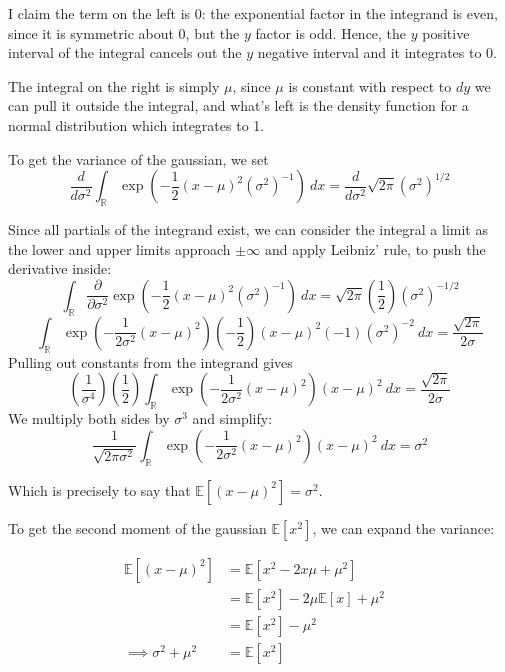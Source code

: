 \documentclass[../main.tex]{subfiles}
\begin{document}
\begin{enumerate}
I claim the term on the left is 0: the exponential factor in the integrand is even, since it is symmetric about 0, but the $y$ factor is odd. Hence, the $y$ positive interval of the integral cancels out the $y$ negative interval and it integrates to 0.

The integral on the right is simply $\mu$, since $\mu$ is constant with respect to $dy$ we can pull it outside the integral, and what's left is the density function for a normal distribution which integrates to 1.

To get the variance of the gaussian, we set
$$\frac{d}{d\sigma^2}\int_\mathbb{R} \exp(-\frac{1}{2}(x-\mu)^2(\sigma^2)^{-1}) \ dx = \frac{d}{d\sigma^2}\sqrt{2\pi}(\sigma^2)^{1/2}$$

Since all partials of the integrand exist, we can consider the integral a limit as the lower and upper limits approach $\pm \infty$ and apply Leibniz' rule, to push the derivative inside:
$$\int_\mathbb{R} \frac{\partial}{\partial \sigma^2}
\exp(-\frac{1}{2}(x-\mu)^2(\sigma^2)^{-1}) \ dx = \sqrt{2\pi}\left(\frac{1}{2}\right)(\sigma^2)^{-1/2}$$
$$\int_\mathbb{R} \exp\left(-\frac{1}{2\sigma^2}(x - \mu)^2\right)\left(-\frac{1}{2}\right)(x-\mu)^2(-1)(\sigma^2)^{-2} \ dx = \frac{\sqrt{2\pi}}{2\sigma}$$
Pulling out constants from the integrand gives
$$\left(\frac{1}{\sigma^4}\right)\left(\frac{1}{2}\right)\int_\mathbb{R} \exp\left(-\frac{1}{2\sigma^2}(x-\mu)^2\right)(x-\mu)^2 \ dx = \frac{\sqrt{2\pi}}{2\sigma}$$
We multiply both sides by $\sigma^3$ and simplify:
$$\frac{1}{\sqrt{2\pi\sigma^2}}\int_\mathbb{R} \exp\left(-\frac{1}{2\sigma^2}(x-\mu)^2\right)(x-\mu)^2 \ dx = \sigma^2$$

Which is precisely to say that $\mathbb{E}[(x-\mu)^2] = \sigma^2$.

To get the second moment of the gaussian $\mathbb{E}[x^2]$, we can expand the variance:

\begin{align*}
	\mathbb{E}[(x-\mu)^2] &= \mathbb{E}[x^2 -2x\mu + \mu^2] &\\
	&=\mathbb{E}[x^2] - 2\mu\mathbb{E}[x] + \mu^2 &\\
	&= \mathbb{E}[x^2] - \mu^2 &\\
\implies \sigma^2 + \mu^2 &= \mathbb{E}[x^2]
\end{align*}


\end{enumerate}
\end{document}
